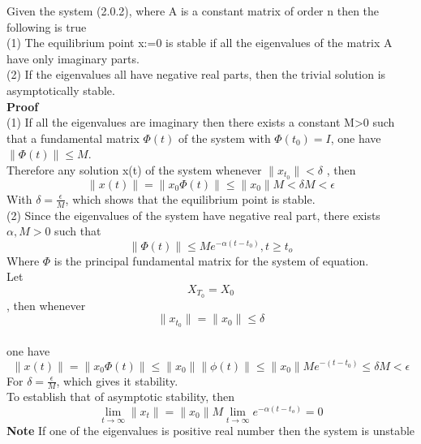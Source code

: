 \documentclass[a4paper,12pt]{report}
\numberwithin{equation}{section}
\begin{document}
\theorem Given the system (2.0.2), where A is a constant matrix of order n then the following is true \\
(1) The equilibrium point x:=0 is stable if all the eigenvalues of the matrix A have only imaginary parts.\\
(2) If the eigenvalues all have negative real parts, then the trivial solution is asymptotically stable. \\
\textbf{Proof} \\
(1) If all the eigenvalues are imaginary then there exists a constant M>0 such that a fundamental matrix $\Phi (t)$ of the system with $\Phi(t_0)=I$, one have $\| \Phi (t)\| \leq M$. \\
Therefore any solution x(t) of the system whenever $\|x_{t_0}\| < \delta$ , then \\
\begin{equation*}
\|x(t)\| = \|x_{0}\Phi (t)\| \leq \|x_{0}\|M <\delta M < \epsilon 
\end{equation*}
With $\delta = \frac{\epsilon}{M}$, which shows that the equilibrium point is stable. \\
(2) Since the eigenvalues of the system have negative real part, there exists $\alpha,M >0$ such that 
\begin{equation*}
\|\Phi(t)\| \leq Me^{-\alpha(t-t_{0})} , t\geq t_{o}
\end{equation*}
Where $\Phi$ is the principal fundamental matrix for the system of equation.\\
Let $$ X_{T_{0}}=  X_{0} $$, then whenever $$ \| x_{t_0} \|= \| x_{0} \| \leq \delta $$ \\
one have 
\begin{equation*}
\|x(t)\|=\|x_{0}\Phi (t)\| \leq \|x_0\|\|\phi (t)\| \leq \|x_{0}\| Me^{-(t-t_0)} \leq \delta M <\epsilon 
\end{equation*}
For $\delta = \frac{\epsilon}{M}$, which gives it stability. \\
To establish that of asymptotic stability, then 
\begin{equation*}
\lim_{t\to \infty}\|x_{t}\|=\|x_{0}\|M \lim_{t \to \infty}e^{-\alpha(t-t_o)}=0
\end{equation*} 
\textbf{Note} If one of the eigenvalues is positive real number then the system is unstable
\end{document}
